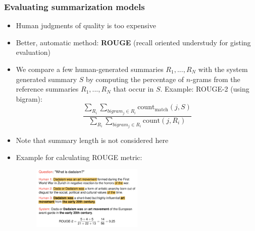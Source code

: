 \subsubsection{Evaluating summarization models}
\begin{itemize}
	\item Human judgments of quality is too expensive
	\item Better, automatic method: \textbf{ROUGE} (recall oriented understudy for gisting evaluation)
	\item We compare a few human-generated summaries $R_1, ..., R_N$ with the system generated summary $S$ by computing the percentage of $n$-grams from the reference summaries $R_1,...,R_N$ that occur in $S$. Example: ROUGE-2 (using bigram):
	$$\frac{\sum_{R_i}\sum_{bigram_j\in R_i} \text{count}_{\text{match}}(j,S)}{\sum_{R_i}\sum_{bigram_j\in R_i} \text{count}(j, R_i)}$$
	\item Note that summary length is not considered here 
	\item Example for calculating ROUGE metric:
	\begin{figure}[ht]
		\centering
		\includegraphics[width=0.5\textwidth]{figures/summarization_rogue_example.png}
		\label{fig:summarization_rogue_example}
	\end{figure}
\end{itemize}